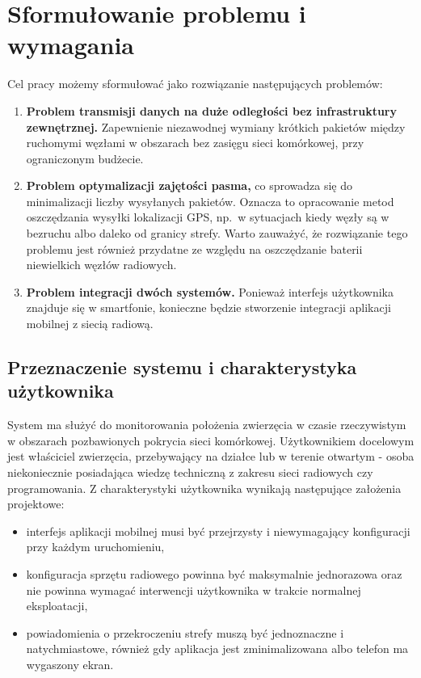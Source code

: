 \newpage
\section{Sformułowanie problemu i wymagania}
\label{sec:wymagania}

Cel pracy możemy sformułować jako rozwiązanie następujących problemów:
\begin{enumerate}
    \item \textbf{Problem transmisji danych na duże odległości bez infrastruktury zewnętrznej.}
          Zapewnienie niezawodnej wymiany krótkich pakietów między ruchomymi węzłami
          w obszarach bez zasięgu sieci komórkowej, przy ograniczonym budżecie.
    \item \textbf{Problem optymalizacji zajętości pasma,} co sprowadza się do minimalizacji liczby
          wysyłanych pakietów. Oznacza to opracowanie metod oszczędzania wysyłki lokalizacji GPS,
          np.\ w sytuacjach kiedy węzły są w bezruchu albo daleko od granicy strefy. Warto zauważyć,
          że rozwiązanie tego problemu jest również przydatne ze względu na oszczędzanie baterii
          niewielkich węzłów radiowych.
    \item \textbf{Problem integracji dwóch systemów.} Ponieważ interfejs użytkownika znajduje się
          w smartfonie, konieczne będzie stworzenie integracji aplikacji mobilnej z siecią radiową.
\end{enumerate}

\subsection*{Przeznaczenie systemu i charakterystyka użytkownika}

System ma służyć do monitorowania położenia zwierzęcia w czasie rzeczywistym w obszarach
pozbawionych pokrycia sieci komórkowej. Użytkownikiem docelowym jest właściciel zwierzęcia,
przebywający na działce lub w terenie otwartym - osoba niekoniecznie posiadająca wiedzę techniczną
z zakresu sieci radiowych czy programowania. Z charakterystyki użytkownika wynikają następujące
założenia projektowe:
\begin{itemize}
    \item interfejs aplikacji mobilnej musi być przejrzysty i niewymagający konfiguracji
          przy każdym uruchomieniu,
    \item konfiguracja sprzętu radiowego powinna być maksymalnie jednorazowa oraz nie powinna
          wymagać interwencji użytkownika w trakcie normalnej eksploatacji,
    \item powiadomienia o przekroczeniu strefy muszą być jednoznaczne i natychmiastowe, również
          gdy aplikacja jest zminimalizowana albo telefon ma wygaszony ekran.
\end{itemize}

